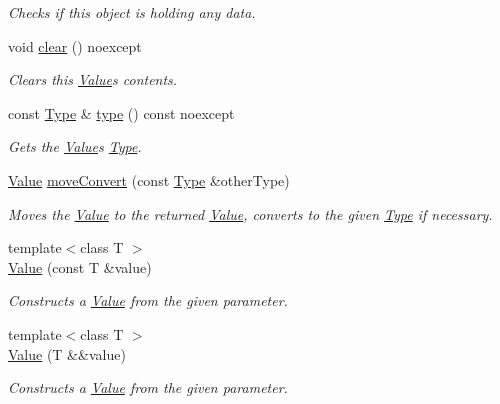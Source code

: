 \begin{DoxyCompactItemize}
\begin{DoxyCompactList}\small\item\em Checks if this object is holding any data. \end{DoxyCompactList}\item 
void \hyperlink{classdg_1_1deepcore_1_1_value_a437ebe636c3eb1fae63b3921b395a123}{clear} () noexcept
\begin{DoxyCompactList}\small\item\em Clears this \hyperlink{classdg_1_1deepcore_1_1_value}{Value}\textquotesingle{}s contents. \end{DoxyCompactList}\item 
const \hyperlink{classdg_1_1deepcore_1_1_type}{Type} \& \hyperlink{classdg_1_1deepcore_1_1_value_abbcca617f78f66202f6ec22967338dcf}{type} () const noexcept
\begin{DoxyCompactList}\small\item\em Gets the \hyperlink{classdg_1_1deepcore_1_1_value}{Value}\textquotesingle{}s \hyperlink{classdg_1_1deepcore_1_1_type}{Type}. \end{DoxyCompactList}\item 
\hyperlink{classdg_1_1deepcore_1_1_value}{Value} \hyperlink{classdg_1_1deepcore_1_1_value_a15d14bf59fdbb6b96ac86bd2008e1305}{move\+Convert} (const \hyperlink{classdg_1_1deepcore_1_1_type}{Type} \&other\+Type)
\begin{DoxyCompactList}\small\item\em Moves the \hyperlink{classdg_1_1deepcore_1_1_value}{Value} to the returned \hyperlink{classdg_1_1deepcore_1_1_value}{Value}, converts to the given \hyperlink{classdg_1_1deepcore_1_1_type}{Type} if necessary. \end{DoxyCompactList}\item 
{\footnotesize template$<$class T $>$ }\\\hyperlink{classdg_1_1deepcore_1_1_value_a98e95afa16652d7f44e18326f118d024}{Value} (const T \&value)
\begin{DoxyCompactList}\small\item\em Constructs a \hyperlink{classdg_1_1deepcore_1_1_value}{Value} from the given parameter. \end{DoxyCompactList}\item 
{\footnotesize template$<$class T $>$ }\\\hyperlink{classdg_1_1deepcore_1_1_value_a57a57fda296a7a3f8b70134f8caca46f}{Value} (T \&\&value)
\begin{DoxyCompactList}\small\item\em Constructs a \hyperlink{classdg_1_1deepcore_1_1_value}{Value} from the given parameter. \end{DoxyCompactList}\item 

\end{DoxyCompactItemize}
